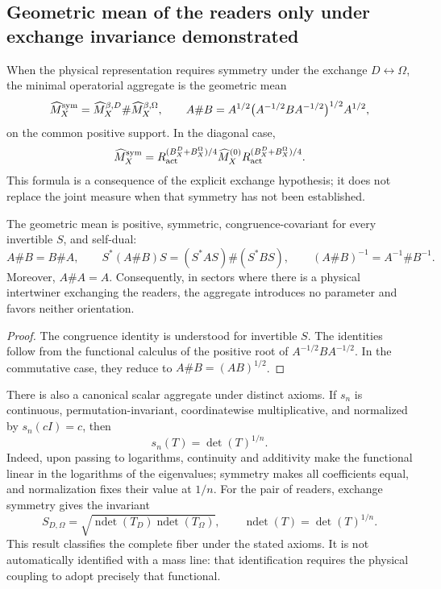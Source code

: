 \subsection{Geometric mean of the readers only under exchange invariance demonstrated}

When the physical representation requires symmetry under the exchange
\(D\leftrightarrow\Omega\), the minimal operatorial aggregate is the geometric
mean
\[
 \widehat M_X^{\rm sym}
 =\widehat M_X^{\beta,D}\#\widehat M_X^{\beta,\Omega},
 \qquad
 A\#B
 =A^{1/2}\bigl(A^{-1/2}BA^{-1/2}\bigr)^{1/2}A^{1/2},
\]
on the common positive support. In the diagonal case,
\[
 \widehat M_X^{\rm sym}
 =R_{\rm act}^{(B_X^D+B_X^\Omega)/4}
  \widehat M_X^{(0)}
  R_{\rm act}^{(B_X^D+B_X^\Omega)/4}.
\]
This formula is a consequence of the explicit exchange hypothesis; it does not
replace the joint measure when that symmetry has not been established.

\begin{theorem}
The geometric mean is positive, symmetric, congruence-covariant for
every invertible \(S\), and self-dual:
\[
 A\#B=B\#A,
 \qquad
 S^*(A\#B)S=(S^*AS)\#(S^*BS),
 \qquad
 (A\#B)^{-1}=A^{-1}\#B^{-1}.
\]
Moreover, \(A\#A=A\). Consequently, in sectors where there is a
physical intertwiner exchanging the readers, the aggregate introduces no
parameter and favors neither orientation.
\end{theorem}

\begin{proof}
The congruence identity is understood for invertible \(S\). The identities
follow from the functional calculus of the positive root of
\(A^{-1/2}BA^{-1/2}\). In the commutative case, they reduce to
\(A\#B=(AB)^{1/2}\).
\end{proof}

There is also a canonical scalar aggregate under distinct axioms. If
\(s_n\) is continuous, permutation-invariant, coordinatewise
multiplicative, and normalized by \(s_n(cI)=c\), then
\[
 s_n(T)=\det(T)^{1/n}.
\]
Indeed, upon passing to logarithms, continuity and additivity make the
functional linear in the logarithms of the eigenvalues; symmetry makes all
coefficients equal, and normalization fixes their value at \(1/n\). For the pair of
readers, exchange symmetry gives the invariant
\[
 S_{D,\Omega}
 =\sqrt{
 \operatorname{ndet}(T_D)\operatorname{ndet}(T_\Omega)},
 \qquad
 \operatorname{ndet}(T)=\det(T)^{1/n}.
\]
This result classifies the complete fiber under the stated axioms. It is not
automatically identified with a mass line: that identification requires
the physical coupling to adopt precisely that functional.

